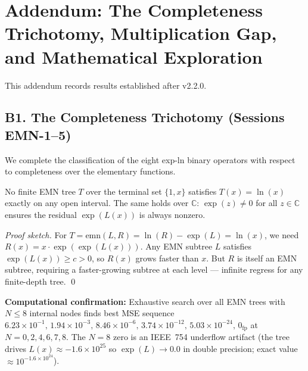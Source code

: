 
\section*{Addendum: The Completeness Trichotomy, Multiplication Gap, and Mathematical Exploration}

This addendum records results established after v2.2.0.

\subsection*{B1. The Completeness Trichotomy (Sessions EMN-1--5)}

We complete the classification of the eight exp-ln binary operators with respect
to completeness over the elementary functions.

\begin{theorem}
No finite EMN tree $T$ over the terminal set $\{1, x\}$ satisfies
$T(x) = \ln(x)$ exactly on any open interval. The same holds over $\mathbb{C}$:
$\exp(z) \neq 0$ for all $z \in \mathbb{C}$ ensures the residual $\exp(L(x))$
is always nonzero.
\end{theorem}

\begin{proof}[Proof sketch]
For $T = \mathrm{emn}(L, R) = \ln(R) - \exp(L) = \ln(x)$, we need
$R(x) = x \cdot \exp(\exp(L(x)))$. Any EMN subtree $L$ satisfies
$\exp(L(x)) \geq c > 0$, so $R(x)$ grows faster than $x$. But $R$ is itself
an EMN subtree, requiring a faster-growing subtree at each level — infinite
regress for any finite-depth tree. \qed
\end{proof}

\textbf{Computational confirmation:} Exhaustive search over all EMN trees with
$N \leq 8$ internal nodes finds best MSE sequence
$6.23 \times 10^{-1},\, 1.94 \times 10^{-3},\, 8.46 \times 10^{-6},\,
3.74 \times 10^{-12},\, 5.03 \times 10^{-24},\, 0_{\text{fp}}$ at $N = 0,2,4,6,7,8$.
The $N=8$ zero is an IEEE~754 underflow artifact (the tree drives $L(x) \approx -1.6 \times 10^{25}$
so $\exp(L) \to 0.0$ in double precision; exact value $\approx 10^{-1.6 \times 10^{24}}$).

